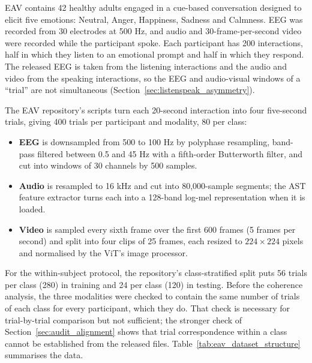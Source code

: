 EAV \cite{Lee2024EAV} contains 42 healthy adults engaged in a cue-based conversation designed to elicit five emotions: Neutral, Anger, Happiness, Sadness and Calmness. EEG was recorded from 30 electrodes at 500 Hz, and audio and 30-frame-per-second video were recorded while the participant spoke. Each participant has 200 interactions, half in which they listen to an emotional prompt and half in which they respond. The released EEG is taken from the listening interactions and the audio and video from the speaking interactions, so the EEG and audio-visual windows of a ``trial'' are not simultaneous (Section~\ref{sec:listenspeak_asymmetry}).

The EAV repository's scripts turn each 20-second interaction into four five-second trials, giving 400 trials per participant and modality, 80 per class:
\begin{itemize}
    \item \textbf{EEG} is downsampled from 500 to 100 Hz by polyphase resampling, band-pass filtered between 0.5 and 45 Hz with a fifth-order Butterworth filter, and cut into windows of 30 channels by 500 samples.
    \item \textbf{Audio} is resampled to 16 kHz and cut into 80{,}000-sample segments; the AST feature extractor turns each into a 128-band log-mel representation when it is loaded.
    \item \textbf{Video} is sampled every sixth frame over the first 600 frames (5 frames per second) and split into four clips of 25 frames, each resized to $224\times224$ pixels and normalised by the ViT's image processor.
\end{itemize}

For the within-subject protocol, the repository's class-stratified split puts 56 trials per class (280) in training and 24 per class (120) in testing. Before the coherence analysis, the three modalities were checked to contain the same number of trials of each class for every participant, which they do. That check is necessary for trial-by-trial comparison but not sufficient; the stronger check of Section~\ref{sec:audit_alignment} shows that trial correspondence within a class cannot be established from the released files. Table~\ref{tab:eav_dataset_structure} summarises the data.

